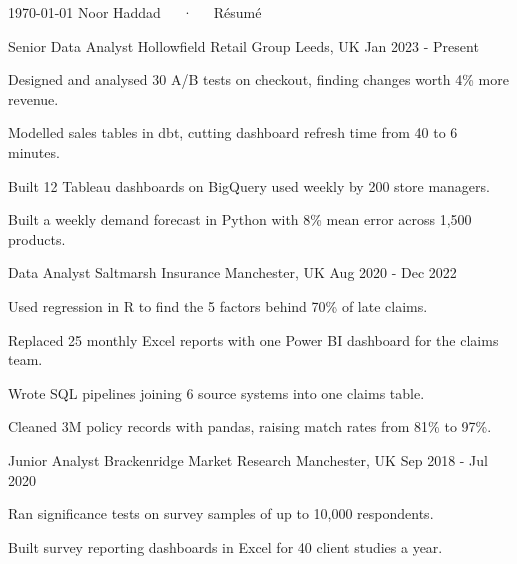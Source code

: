 \documentclass[11pt, a4paper]{awesome-cv}
\begin{document}
\makecvheader[C]

\makecvfooter
  {\today}
  {Noor Haddad~~~·~~~Résumé}
  {\thepage}


\begin{cventries}

  \cventry
    {Senior Data Analyst} %
    {Hollowfield Retail Group} %
    {Leeds, UK} %
    {Jan 2023 - Present} %
    {
      \begin{cvitems} %
        \item {Designed and analysed 30 A/B tests on checkout, finding changes worth 4\% more revenue.} %
        \item {Modelled sales tables in dbt, cutting dashboard refresh time from 40 to 6 minutes.} %
        \item {Built 12 Tableau dashboards on BigQuery used weekly by 200 store managers.} %
        \item {Built a weekly demand forecast in Python with 8\% mean error across 1,500 products.} %
      \end{cvitems}
    }

  \cventry
    {Data Analyst} %
    {Saltmarsh Insurance} %
    {Manchester, UK} %
    {Aug 2020 - Dec 2022} %
    {
      \begin{cvitems} %
        \item {Used regression in R to find the 5 factors behind 70\% of late claims.} %
        \item {Replaced 25 monthly Excel reports with one Power BI dashboard for the claims team.} %
        \item {Wrote SQL pipelines joining 6 source systems into one claims table.} %
        \item {Cleaned 3M policy records with pandas, raising match rates from 81\% to 97\%.} %
      \end{cvitems}
    }

  \cventry
    {Junior Analyst} %
    {Brackenridge Market Research} %
    {Manchester, UK} %
    {Sep 2018 - Jul 2020} %
    {
      \begin{cvitems} %
        \item {Ran significance tests on survey samples of up to 10,000 respondents.} %
        \item {Built survey reporting dashboards in Excel for 40 client studies a year.} %
      \end{cvitems}
    }

\end{cventries}
\end{document}
